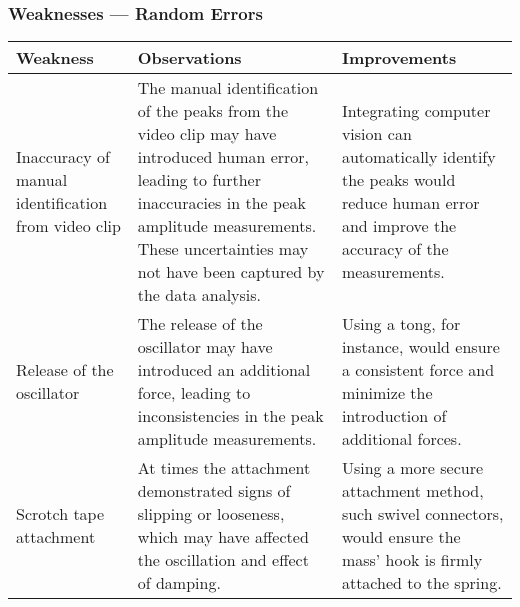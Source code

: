 \documentclass[a4paper,12pt]{article}
\newcommand{\thcolor}{\cellcolor{Blue!25}}
\begin{document}
\subsubsection{Weaknesses --- Random Errors}

\begin{center}
  \begin{tabular}{|p{}|p{}|p{}|}
    \hline
    \thcolor Weakness                                   & \thcolor Observations                                                                                                                                                                                                                & \thcolor Improvements                                                                                                                   \\ \hline
    Inaccuracy of manual identification from video clip & The manual identification of the peaks from the video clip may have introduced human error, leading to further inaccuracies in the peak amplitude measurements. These uncertainties may not have been captured by the data analysis. & Integrating computer vision can automatically identify the peaks would reduce human error and improve the accuracy of the measurements. \\ \hline
    Release of the oscillator                           & The release of the oscillator may have introduced an additional force, leading to inconsistencies in the peak amplitude measurements.                                                                                                & Using a tong, for instance, would ensure a consistent force and minimize the introduction of additional forces.                         \\ \hline
    Scrotch tape attachment                             & At times the attachment demonstrated signs of slipping or looseness, which may have affected the oscillation and effect of damping.                                                                                                  & Using a more secure attachment method, such swivel connectors, would ensure the mass' hook is firmly attached to the spring.            \\ \hline
  \end{tabular}
\end{center}

\pagebreak
\end{document}
